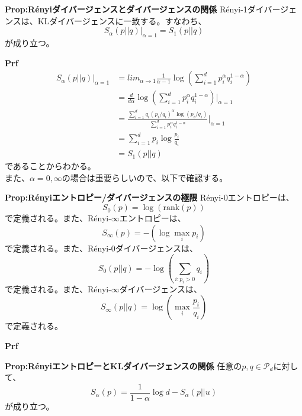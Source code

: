 \documentclass[a4paper,11pt]{jsarticle}
\numberwithin{equation}{section}
\begin{document}
\begin{itembox}[l]{\textbf{Prop:Rényiダイバージェンスとダイバージェンスの関係}}
    Rényi-1ダイバージェンスは、KLダイバージェンスに一致する。すなわち、
    \begin{equation}
        S_{\alpha}(p||q)|_{\alpha = 1} = S_1(p||q)
    \end{equation}
    が成り立つ。
\end{itembox}
\textbf{Prf}\\
\begin{align}
    S_{\alpha}(p||q)|_{\alpha = 1} &= lim_{\alpha \to 1}\frac{1}{\alpha - 1}\log(\sum_{i=1}^{d}p_i^{\alpha}q_i^{1-\alpha})\\
    &= \frac{d}{d\alpha}\log(\sum_{i=1}^{d}p_i^{\alpha}q_i^{1-\alpha})|_{\alpha = 1}\\
    &= \frac{\sum_{i=1}^{d}q_i(p_i/q_i)^{\alpha}\log (p_i/q_i)}{\sum_{i=1}^{d}p_i^{\alpha}q_i^{1-\alpha}}|_{\alpha = 1}\\%
    &= \sum_{i=1}^{d}p_i\log\frac{p_i}{q_i}\\
    &= S_1(p||q)
\end{align}
であることからわかる。\hfill \qedsymbol\\

また、$\alpha =0,\infty$の場合は重要らしいので、以下で確認する。
\begin{itembox}[l]{\textbf{Prop:Rényiエントロピー/ダイバージェンスの極限}}
    Rényi-0エントロピーは、
    \begin{equation}
        S_0(p) = \log (\text{rank}(p))
    \end{equation}
    で定義される。また、Rényi-$\infty$エントロピーは、
    \begin{equation}
        S_{\infty}(p) = -(\log \max_{i}p_i)
    \end{equation}
    で定義される。また、Rényi-0ダイバージェンスは、
    \begin{equation}
        S_0(p||q) = -\log (\sum_{i:p_i > 0}q_i)
    \end{equation}
    で定義される。また、Rényi-$\infty$ダイバージェンスは、
    \begin{equation}
        S_{\infty}(p||q) = \log (\max_{i}\frac{p_i}{q_i})
    \end{equation}
    で定義される。
\end{itembox}
\textbf{Prf}\\

\begin{itembox}[l]{\textbf{Prop:RényiエントロピーとKLダイバージェンスの関係}}
    任意の$p, q \in \mathcal{P}_d$に対して、
    \begin{equation}
        S_{\alpha}(p) = \frac{1}{1-\alpha}\log d - S_{\alpha}(p||u)
    \end{equation}
    が成り立つ。
\end{itembox}
\end{document}
